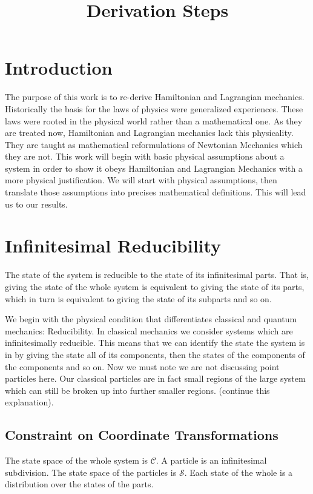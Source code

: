 \documentclass{article}
\begin{document}
\title{Derivation Steps}

\section{Introduction}

	The purpose of this work is to re-derive Hamiltonian and Lagrangian mechanics. Historically the basis for the laws of physics were generalized experiences. These laws were rooted in the physical world rather than a mathematical one. As they are treated now, Hamiltonian and Lagrangian mechanics lack this physicality. They are taught as mathematical reformulations of Newtonian Mechanics which they are not. This work will begin with basic physical assumptions about a system in order to show it obeys Hamiltonian and Lagrangian Mechanics with a more physical justification. We will start with physical assumptions, then translate those assumptions into precises mathematical definitions. This will lead us to our results.

\section{Infinitesimal Reducibility}
	
\begin{assump}
	The state of the system is reducible to the state of its infinitesimal parts. That is, giving the state of the whole system is equivalent to giving the state of its parts, which in turn is equivalent to giving the state of its subparts and so on.
\end{assump}

	We begin with the physical condition that differentiates classical and quantum mechanics: Reducibility. In classical mechanics we consider systems which are infinitesimally reducible. This means that we can identify the state the system is in by giving the state all of its components, then the states of the components of the components and so on. Now we must note we are not discussing point particles here. Our classical particles are in fact small regions of the large system which can still be broken up into further smaller regions. (continue this explanation). 
	
\subsection{Constraint on Coordinate Transformations}

\begin{defn}
	The state space of the whole system is $\mathcal{C}$. A particle is an infinitesimal subdivision. The state space of the particles is $\mathcal{S}$. Each state of the whole is a distribution over the states of the parts.
\end{defn}
\end{document}
